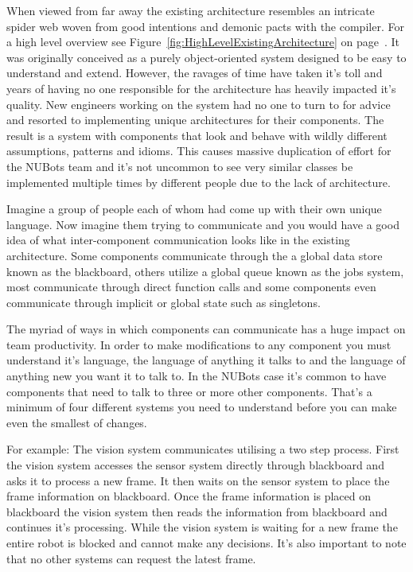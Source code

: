 \documentclass[english,12pt]{scrartcl}
\begin{document}
			When viewed from far away the existing architecture resembles an intricate spider web
			woven from good intentions and demonic pacts with the compiler.
			For a high level overview see Figure~\ref{fig:HighLevelExistingArchitecture} on page~\pageref{fig:HighLevelExistingArchitecture}.
			It was originally conceived as a purely object-oriented system designed to be easy to understand and extend.
			However, the ravages of time have taken it's toll and years of having no one responsible for
			the architecture has heavily impacted it's quality.
			New engineers working on the system had no one to turn to for advice and resorted to
			implementing unique architectures for their components.
			The result is a system with components that look and behave with wildly different assumptions, patterns and
			idioms.
			This causes massive duplication of effort for the NUBots team and it's not uncommon to see very similar classes be
			implemented multiple times by different people due to the lack of architecture.

			Imagine a group of people each of whom had come up with their own unique language.
			Now imagine them trying to communicate and you would have a good idea of what inter-component communication
			looks like in the existing architecture.
			Some components communicate through the a global data store known as the blackboard,
			others utilize a global queue known as the jobs system, most communicate through
			direct function calls and some components even communicate through implicit or global state such as singletons. 

			The myriad of ways in which components can communicate has a huge impact on team productivity.
			In order to make modifications to any component you must understand it's language, the language of anything
			it talks to and the language of anything new you want it to talk to. In the NUBots case it's common to have components
			that need to talk to three or more other components.
			That's a minimum of four different systems you need to understand before you can make even the smallest of changes.

			For example: The vision system communicates utilising a two step process.
			First the vision system accesses the sensor system directly through blackboard and asks it to process a new frame.
			It then waits on the sensor system to place the frame information on blackboard.
			Once the frame information is placed on blackboard the vision system then reads the information
			from blackboard and continues it's processing.
			While the vision system is waiting for a new frame the entire robot is blocked and cannot make any decisions.
			It's also important to note that no other systems can request the latest frame.
\end{document}
